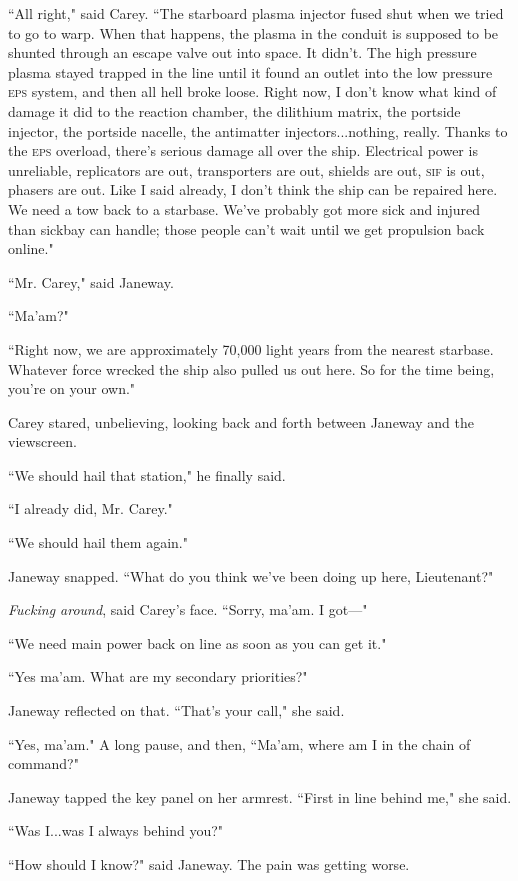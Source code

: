 \documentclass[twoside,letterpaper,12pt]{memoir}
\begin{document}
``All right," said Carey. ``The starboard plasma injector fused shut when we tried to go to warp. When that happens, the plasma in the conduit is supposed to be shunted through an escape valve out into space. It didn't. The high pressure plasma stayed trapped in the line until it found an outlet into the low pressure \textsc{eps} system, and then all hell broke loose. Right now, I don't know what kind of damage it did to the reaction chamber, the dilithium matrix, the portside injector, the portside nacelle, the antimatter injectors...nothing, really. Thanks to the \textsc{eps} overload, there's serious damage all over the ship. Electrical power is unreliable, replicators are out, transporters are out, shields are out, \textsc{sif} is out, phasers are out. Like I said already, I don't think the ship can be repaired here. We need a tow back to a starbase. We've probably got more sick and injured than sickbay can handle; those people can't wait until we get propulsion back online."

``Mr. Carey," said Janeway.

``Ma'am?"

``Right now, we are approximately 70,000 light years from the nearest starbase. Whatever force wrecked the ship also pulled us out here. So for the time being, you're on your own."

Carey stared, unbelieving, looking back and forth between Janeway and the viewscreen.

``We should hail that station," he finally said.

``I already did, Mr. Carey."

``We should hail them again."

Janeway snapped. ``What do you think we've been doing up here, Lieutenant?"

\textit{Fucking around}, said Carey's face. ``Sorry, ma'am. I got---"

``We need main power back on line as soon as you can get it."

``Yes ma'am. What are my secondary priorities?"

Janeway reflected on that. ``That's your call," she said.

``Yes, ma'am." A long pause, and then, ``Ma'am, where am I in the chain of command?"

Janeway tapped the key panel on her armrest. ``First in line behind me," she said.

``Was I...was I always behind you?"

``How should I know?" said Janeway. The pain was getting worse.
\end{document}

